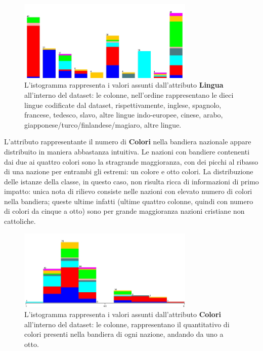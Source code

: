 \documentclass[a4paper,11pt,twoside,notitlepage,final]{scrartcl}
\begin{document}
\begin{figure}[H]
  \centering
  \includegraphics[width=0.75\textwidth]{fig/religion-language.jpg}%
  \caption{%
    L'istogramma rappresenta i valori assunti dall'attributo \textbf{Lingua}
    all'interno del dataset: le colonne, nell'ordine rappresentano le dieci lingue codificate dal dataset, rispettivamente,
    inglese, spagnolo, francese, tedesco, slavo, altre lingue indo-europee, cinese, arabo, giapponese/turco/finlandese/magiaro, altre lingue.
    }%
  \label{fig:language}
\end{figure}

L'attributo rappresentante il numero di \textbf{Colori} nella bandiera nazionale appare distribuito in maniera abbastanza intuitiva.
Le nazioni con bandiere contenenti dai due ai quattro colori sono la stragrande maggioranza, con dei picchi al ribasso di una nazione per entrambi gli estremi: un colore e otto colori.
La distribuzione delle istanze della classe, in questo caso, non risulta ricca di informazioni di primo impatto: unica nota di rilievo consiste nelle nazioni con elevato numero di colori nella bandiera;
queste ultime infatti (ultime quattro colonne, quindi con numero di colori da cinque a otto) sono per grande maggioranza nazioni cristiane non cattoliche.

\begin{figure}[H]
  \centering
  \includegraphics[width=0.75\textwidth]{fig/religion-colours.jpg}%
  \caption{%
    L'istogramma rappresenta i valori assunti dall'attributo \textbf{Colori}
    all'interno del dataset: le colonne, rappresentano il quantitativo di colori presenti nella bandiera di ogni nazione, andando da uno a otto.
    }%
  \label{fig:colours}
\end{figure}
\end{document}
